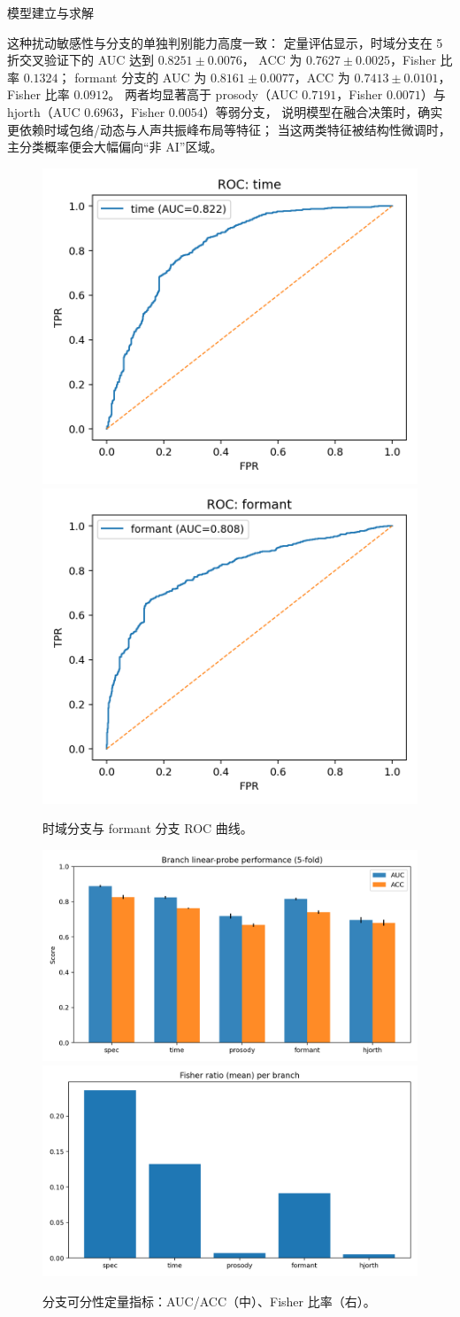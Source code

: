 \documentclass[aspectratio=169]{beamer}
\begin{document}
\begin{frame}{模型建立与求解}
\begin{itemize}
\end{itemize}

这种扰动敏感性与分支的单独判别能力高度一致：
定量评估显示，时域分支在 5 折交叉验证下的 AUC 达到 $0.8251\!\pm\!0.0076$，
ACC 为 $0.7627\!\pm\!0.0025$，Fisher 比率 $0.1324$；
formant 分支的 AUC 为 $0.8161\!\pm\!0.0077$，ACC 为 $0.7413\!\pm\!0.0101$，
Fisher 比率 $0.0912$。
两者均显著高于 prosody（AUC $0.7191$，Fisher $0.0071$）与 hjorth（AUC $0.6963$，Fisher $0.0054$）等弱分支，
说明模型在融合决策时，确实更依赖时域包络/动态与人声共振峰布局等特征；
当这两类特征被结构性微调时，主分类概率便会大幅偏向“非 AI”区域。

\begin{figure}[H]
  \centering
  \includegraphics[width=.45\linewidth]{images_in_paper/roc_time.png}
  \includegraphics[width=.45\linewidth]{images_in_paper/roc_formant.png}
  \caption{时域分支与 formant 分支 ROC 曲线。}
  \label{fig:roc}
\end{figure}

\begin{figure}[H]
  \centering
  \includegraphics[width=.32\linewidth]{images_in_paper/branch_metrics_auc_acc.png}
  \includegraphics[width=.32\linewidth]{images_in_paper/branch_fisher.png}
  \caption{分支可分性定量指标：AUC/ACC（中）、Fisher 比率（右）。}
  \label{fig:branch_silhouette}
  \label{fig:branch_aucacc}
  \label{fig:branch_fisher}
\end{figure}



\end{frame}
\end{document}
